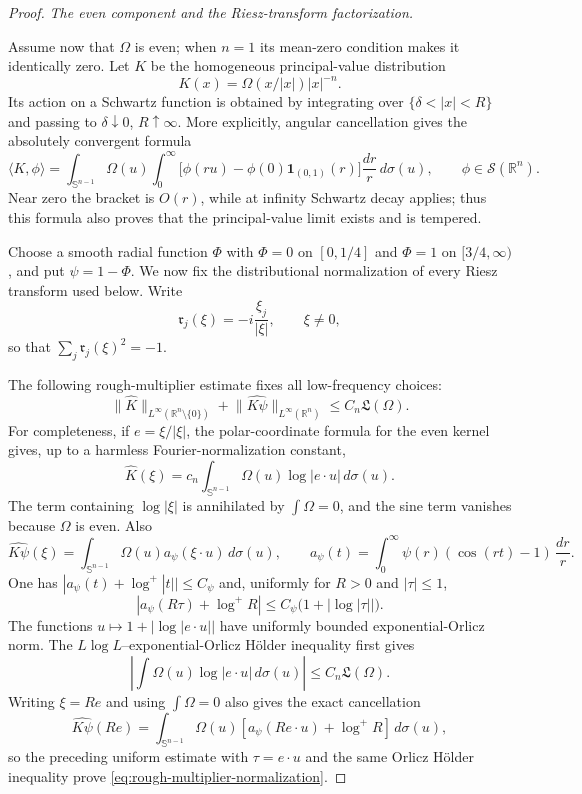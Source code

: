 \documentclass[11pt]{article}
\numberwithin{equation}{section}
\theoremstyle{remark}
\theoremstyle{definition}
\newcommand{\R}{\mathbb R}
\newcommand{\Sph}{\mathbb S}
\newcommand{\norm}[1]{\lVert #1\rVert}
\begin{document}
\begin{proof}
\smallskip
\noindent\emph{The even component and the Riesz-transform factorization.}

Assume now that $\Omega$ is even; when $n=1$ its mean-zero condition makes
it identically zero.  Let $K$ be the homogeneous principal-value
distribution
\[
 K(x)=\Omega(x/|x|)|x|^{-n}.
\]
Its action on a Schwartz function is obtained by integrating over
$\{\delta<|x|<R\}$ and passing to $\delta\downarrow0$,
$R\uparrow\infty$.  More explicitly, angular cancellation gives the
absolutely convergent formula
\[
 \langle K,\phi\rangle
 =\int_{\Sph^{n-1}}\Omega(u)\int_0^\infty
 \bigl[\phi(ru)-\phi(0)\mathbf1_{(0,1)}(r)\bigr]
 \frac{dr}{r}\,d\sigma(u),
 \qquad \phi\in\mathcal S(\R^n).
\]
Near zero the bracket is $O(r)$, while at infinity Schwartz decay applies;
thus this formula also proves that the principal-value limit exists and is
tempered.

Choose a smooth radial function $\Phi$ with $\Phi=0$ on $[0,1/4]$ and
$\Phi=1$ on $[3/4,\infty)$, and put $\psi=1-\Phi$.  We now fix the
distributional normalization of every Riesz transform used below.  Write
\[
 \mathfrak r_j(\xi)=-i\frac{\xi_j}{|\xi|},\qquad \xi\ne0,
\]
so that $\sum_j\mathfrak r_j(\xi)^2=-1$.

The following rough-multiplier estimate fixes all low-frequency choices:
\begin{equation}\label{eq:rough-multiplier-normalization}
 \norm{\widehat K}_{L^\infty(\R^n\setminus\{0\})}
 +\norm{\widehat{K\psi}}_{L^\infty(\R^n)}
 \le C_n\mathfrak L(\Omega).
\end{equation}
For completeness, if $e=\xi/|\xi|$, the polar-coordinate formula for the
even kernel gives, up to a harmless Fourier-normalization constant,
\[
 \widehat K(\xi)
 =c_n\int_{\Sph^{n-1}}\Omega(u)\log|e\cdot u|\,d\sigma(u).
\]
The term containing $\log|\xi|$ is annihilated by $\int\Omega=0$, and
the sine term vanishes because $\Omega$ is even.  Also
\[
 \widehat{K\psi}(\xi)
 =\int_{\Sph^{n-1}}\Omega(u)a_\psi(\xi\cdot u)\,d\sigma(u),
 \qquad
 a_\psi(t)=\int_0^\infty\psi(r)(\cos(rt)-1)\,\frac{dr}{r}.
\]
One has $|a_\psi(t)+\log^+|t||\le C_\psi$ and, uniformly for $R>0$
and $|\tau|\le1$,
\[
 |a_\psi(R\tau)+\log^+R|
 \le C_\psi\bigl(1+|\log|\tau||\bigr).
\]
The functions $u\mapsto1+|\log|e\cdot u||$ have uniformly bounded
exponential-Orlicz norm.  The $L\log L$--exponential-Orlicz H\"older
inequality first gives
\[
 \left|\int\Omega(u)\log|e\cdot u|\,d\sigma(u)\right|
 \le C_n\mathfrak L(\Omega).
\]
Writing $\xi=Re$ and using $\int\Omega=0$ also gives the exact
cancellation
\[
 \widehat{K\psi}(Re)
 =\int_{\Sph^{n-1}}\Omega(u)
   [a_\psi(Re\cdot u)+\log^+R]\,d\sigma(u),
\]
so the preceding uniform estimate with $\tau=e\cdot u$ and the same
Orlicz H\"older inequality prove
\eqref{eq:rough-multiplier-normalization}.


\end{proof}
\end{document}
